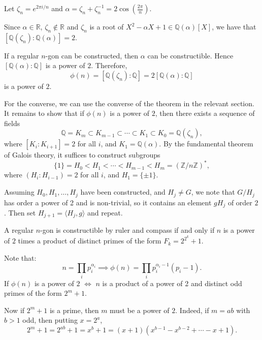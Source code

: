 \documentclass[12pt]{article}
\begin{document}
\begin{proofbox}
	Let $\zeta_n = e^{2\pi i/n}$ and $\alpha = \zeta_n + \zeta_n^{-1} = 2 \cos (\frac{2\pi}{n})$.

	Since $\alpha \in \mathbb{R}$, $\zeta_n \not \in \mathbb{R}$ and $\zeta_n$ is a root of $X^2 - \alpha X + 1 \in \mathbb{Q}(\alpha)[X]$,  we have that $[\mathbb{Q}(\zeta_n) : \mathbb{Q}(\alpha)] = 2$.

	If a regular $n$-gon can be constructed, then $\alpha$ can be constructible. Hence $[\mathbb{Q}(\alpha): \mathbb{Q}]$ is a power of $2$. Therefore,
	\[
		\phi(n) = [ \mathbb{Q}(\zeta_n) : \mathbb{Q}] = 2 [\mathbb{Q}(\alpha) : \mathbb{Q}]
	\]
	is a power of $2$.

	For the converse, we can use the converse of the theorem in the relevant section. It remains to show that if $\phi(n)$ is a power of $2$, then there exists a sequence of fields
	\[
	\mathbb{Q} = K_m \subset K_{m-1} \subset \cdots \subset K_1 \subset K_0 = \mathbb{Q}(\zeta_n),
	\]
	where $[K_i : K_{i+1}] = 2$ for all $i$, and $K_1 = \mathbb{Q}(\alpha)$. By the fundamental theorem of Galois theory, it suffices to construct subgroups
	\[
		\{1\} = H_0 < H_1 < \cdots < H_{m-1} < H_m = (\mathbb{Z} / n \mathbb{Z})^{\ast},
	\]
	where $(H_i : H_{i-1}) = 2$ for all $i$, and $H_1 = \{\pm 1\}$.

	Assuming $H_0, H_1, \ldots, H_j$ have been constructed, and $H_j \neq G$, we note that $G/H_j$ has order a power of 2 and is non-trivial, so it contains an element $gH_j$ of order $2$. Then set $H_{j+1} = \langle H_j, g\rangle$ and repeat.
\end{proofbox}

\begin{corollary}
	A regular $n$-gon is constructible by ruler and compass if and only if $n$ is a power of $2$ times a product of distinct primes of the form $F_k = 2^{2^k} + 1$.
\end{corollary}

\begin{proofbox}
	Note that:
	\[
	n = \prod_{i}p_i^{\alpha_i} \implies \phi(n) = \prod_{i} p_i^{\alpha_i - 1} (p_i - 1).
	\]
	If $\phi(n)$ is a power of $2$ $\iff$ $n$ is a product of a power of 2 and distinct odd primes of the form $2^m + 1$.

	Now if $2^m + 1$ is a prime, then $m$ must be a power of $2$. Indeed, if $m = ab$ with $b > 1$ odd, then putting $x = 2^a$,
	\[
	2^m + 1 = 2^{ab} + 1 = x^b + 1 = (x+1)(x^{b-1} - x^{b-2} + \cdots - x + 1).
	\]
\end{proofbox}
\end{document}
